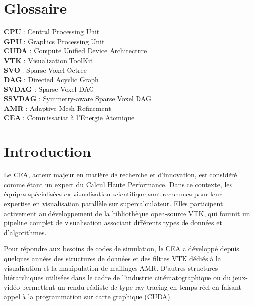 \documentclass[12pt,a4paper,twoside]{article}
\begin{document}
    \newpage

    \section*{Glossaire}                             %
    \noindent
    \textbf{CPU} : Central Processing Unit \\
    \textbf{GPU} : Graphics Processing Unit \\
    \textbf{CUDA} : Compute Unified Device Architecture \\
    \textbf{VTK} : Visualization ToolKit \\
    \textbf{SVO} : Sparse Voxel Octree \\
    \textbf{DAG} : Directed Acyclic Graph \\
    \textbf{SVDAG} : Sparse Voxel DAG \\
    \textbf{SSVDAG} : Symmetry-aware Sparse Voxel DAG \\
    \textbf{AMR} : Adaptive Mesh Refinement \\
    \textbf{CEA} : Commissariat à l'Energie Atomique \\


    \newpage

    \renewcommand{\contentsname}{Sommaire}

    \tableofcontents


    \newpage

    \lstset{numbers=left, tabsize=3, frame=single, numberstyle=\ttfamily,
    basicstyle=\footnotesize}
    \thispagestyle{empty}

    \section{Introduction}                          %



    Le CEA, acteur majeur en matière de recherche et d’innovation, est considéré comme étant un expert du Calcul Haute
    Performance. Dans ce contexte, les équipes spécialisées en visualisation scientifique sont reconnues pour
    leur expertise en visualisation parallèle sur supercalculateur. Elles participent activement au développement de la
    bibliothèque open-source VTK, qui fournit un pipeline complet de visualisation associant différents types de données
    et d’algorithmes.

    Pour répondre aux besoins de codes de simulation, le CEA a développé depuis quelques années des
    structures de données et des filtres VTK dédiés à la visualisation et la manipulation de maillages AMR. D’autres
    structures hiérarchiques utilisées dans le cadre de l’industrie cinématographique ou du jeux-vidéo permettent un rendu
    réaliste de type ray-tracing en temps réel en faisant appel à la programmation sur carte graphique (CUDA).
\end{document}
